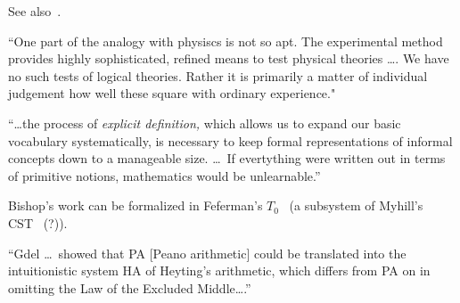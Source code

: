 \label{sec:Kurt_Godel_conviction_and_caution}

\cite[ch~8 ``Introductory note to Kurt G\"{o}del's 1933 lecture'']{Feferman1998LightOfLogic}

See also~\cite{godel1995CollectedIII}.

\label{sec:What_does_logic_tell_us_about_proofs}

\cite[ch~9 ``What does logic have to tell us about mathematical proofs?'']{Feferman1998LightOfLogic}

``One part of the analogy with physiscs is not so apt.
The experimental method provides highly sophisticated, refined
means to test physical theories {\ldots}.
We have no such tests of logical theories.
Rather it is primarily a matter of individual judgement
how well these square with ordinary
experience."~\cite[p~178]{Feferman1998LightOfLogic}

``\ldots the process of \textit{explicit definition,} which allows
us to expand our basic vocabulary systematically,
is necessary to keep formal representations of informal concepts
down to a manageable size. \ldots\ 
If evertything were written out in terms of primitive notions,
mathematics would be 
unlearnable.''~\cite[p~180]{Feferman1998LightOfLogic}

Bishop's work can be formalized 
in Feferman's $T_0$~\cite{feferman1975explicitMath}
(a subsystem of Myhill's CST~\cite{myhill1975CST} (?)).

\label{sec:What_rests_on_what}

\cite[ch~10 ``What rests on what? 
The proof-theoretic analysis of mathematics'']{Feferman1998LightOfLogic}

``Gdel \ldots\ showed that PA [Peano arithmetic]
could be translated into the intuitionistic system HA of
Heyting's arithmetic,
which differs from PA on in omitting the 
Law of the Excluded Middle{\ldots}.''~\cite[190]{Feferman1998LightOfLogic}
\setcounter{currentlevel}{\value{currentlevel}+1 }
\setcounter{currentlevel}{\value{baseSectionLevel}-1 }
\label{sec:Constructivism_SEP}
\cite{sep:mathematics_constructive}

